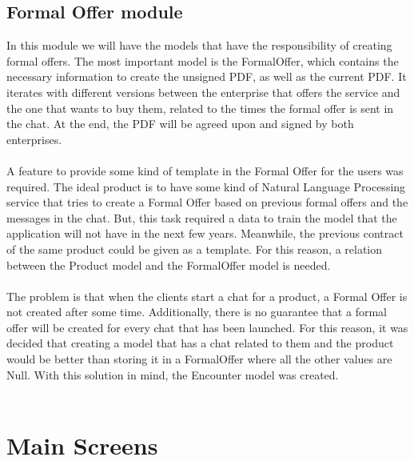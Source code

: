 \documentclass[./main.tex]{subfiles}
\begin{document}
\subsection{Formal Offer module}
In this module we will have the models that have the responsibility of
creating formal offers. The most important model is the FormalOffer,
which contains the necessary information to create the unsigned PDF, as
well as the current PDF. It iterates with different versions between the
enterprise that offers the service and the one that wants to buy them,
related to the times the formal offer is sent in the chat. At the end,
the PDF will be agreed upon and signed by both enterprises.
\\
\\
A feature to provide some kind of template in the Formal Offer for the
users was required. The ideal product is to have some kind of Natural
Language Processing service that tries to create a Formal Offer based on
previous formal offers and the messages in the chat. But, this task
required a data to train the model that the application will not have in
the next few years. Meanwhile, the previous contract of the same product
could be given as a template. For this reason, a relation between the
Product model and the FormalOffer model is needed.
\\
\\
The problem is that when the clients start a chat for a product, a
Formal Offer is not created after some time. Additionally, there is no
guarantee that a formal offer will be created for every chat that has
been launched. For this reason, it was decided that creating a model
that has a chat related to them and the product would be better than
storing it in a FormalOffer where all the other values are Null. With
this solution in mind, the Encounter model was created.
\\
\\
\section{Main Screens} \label{sec:views}
\end{document}

